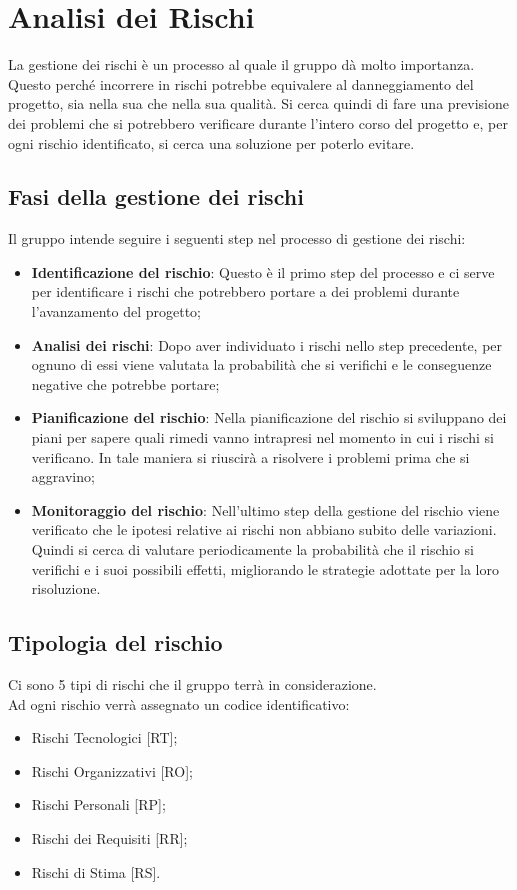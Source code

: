 \section{Analisi dei Rischi}
La gestione dei rischi è un processo al quale il gruppo \Gruppo{} dà molto importanza. Questo perché incorrere in rischi potrebbe equivalere al danneggiamento del progetto, sia nella sua  che nella sua qualità.
Si cerca quindi di fare una previsione dei problemi che si potrebbero verificare durante l'intero corso del progetto e, per ogni rischio identificato, si cerca una soluzione per poterlo evitare.

\subsection{Fasi della gestione dei rischi}
Il gruppo intende seguire i seguenti step nel processo di gestione dei rischi:
\begin{itemize}
	\item \textbf{Identificazione del rischio}: Questo è il primo step del processo e ci serve per identificare i rischi che potrebbero portare a dei problemi durante l'avanzamento del progetto; 
	\item \textbf{Analisi dei rischi}: Dopo aver individuato i rischi nello step precedente, per ognuno di essi viene valutata la probabilità che si verifichi e le conseguenze negative che potrebbe portare;
	\item \textbf{Pianificazione del rischio}: Nella pianificazione del rischio si sviluppano dei piani per sapere quali rimedi vanno intrapresi nel momento in cui i rischi si verificano. In tale maniera si riuscirà a risolvere i problemi prima che si aggravino;
	\item \textbf{Monitoraggio del rischio}: Nell'ultimo step della gestione del rischio viene verificato che le ipotesi relative ai rischi non abbiano subito delle variazioni. Quindi si cerca di valutare periodicamente la probabilità che il rischio si verifichi e i suoi possibili effetti, migliorando le strategie adottate per la loro risoluzione.
\end{itemize}

\subsection{Tipologia del rischio}
Ci sono 5 tipi di rischi che il gruppo \Gruppo{} terrà in considerazione. 
\\Ad ogni rischio verrà assegnato un codice identificativo:
\begin{itemize}
	\item Rischi Tecnologici [RT];
	\item Rischi Organizzativi [RO];
	\item Rischi Personali [RP];
	\item Rischi dei Requisiti [RR];
	\item Rischi di Stima [RS].
\end{itemize}

